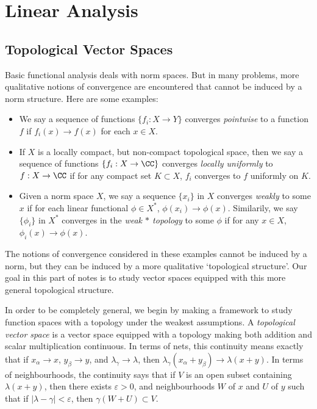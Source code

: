 \part{Linear Analysis}

\chapter{Topological Vector Spaces}

Basic functional analysis deals with norm spaces. But in many problems, more qualitative notions of convergence are encountered that cannot be induced by a norm structure. Here are some examples:
%
\begin{itemize}
    \item We say a sequence of functions $\{ f_i: X \to Y \}$ converges \emph{pointwise} to a function $f$ if $f_i(x) \to f(x)$ for each $x \in X$.

    \item If $X$ is a locally compact, but non-compact topological space, then we say a sequence of functions $\{ f_i: X \to \CC \}$ converges \emph{locally uniformly} to $f: X \to \CC$ if for any compact set $K \subset X$, $f_i$ converges to $f$ uniformly on $K$.

    \item Given a norm space $X$, we say a sequence $\{ x_i \}$ in $X$ converges \emph{weakly} to some $x$ if for each linear functional $\phi \in X^*$, $\phi(x_i) \to \phi(x)$. Similarily, we say $\{ \phi_i \}$ in $X^*$ converges in the \emph{weak $*$ topology} to some $\phi$ if for any $x \in X$, $\phi_i(x) \to \phi(x)$.
\end{itemize}
%
The notions of convergence considered in these examples cannot be induced by a norm, but they can be induced by a more qualitative `topological structure'. Our goal in this part of notes is to study vector spaces equipped with this more general topological structure.

In order to be completely general, we begin by making a framework to study function spaces with a topology under the weakest assumptions. A \emph{topological vector space} is a vector space equipped with a topology making both addition and scalar multiplication continuous. In terms of nets, this continuity means exactly that if $x_\alpha \to x$, $y_\beta \to y$, and $\lambda_\gamma \to \lambda$, then $\lambda_\gamma (x_\alpha + y_\beta) \to \lambda (x + y)$. In terms of neighbourhoods, the continuity says that if $V$ is an open subset containing $\lambda(x + y)$, then there exists $\varepsilon > 0$, and neighbourhoods $W$ of $x$ and $U$ of $y$ such that if $|\lambda - \gamma| < \varepsilon$, then $\gamma(W + U) \subset V$.

